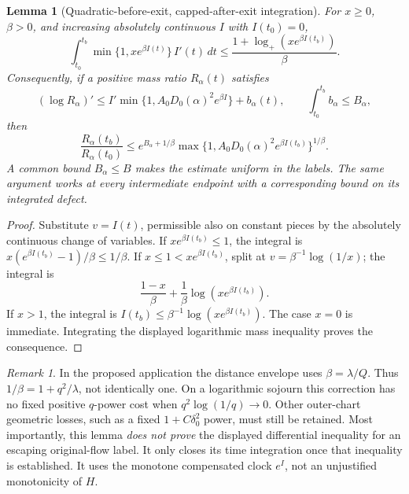 \documentclass[11pt]{article}
\newtheorem{lemma}[theorem]{Lemma}\newtheorem{proposition}[theorem]{Proposition}
\theoremstyle{remark}\newtheorem{remark}[theorem]{Remark}
\newcommand{\dd}{\,d}\newcommand{\E}{\mathbb E}
\begin{document}
\begin{lemma}[Quadratic-before-exit, capped-after-exit integration]
\label{inc:AN03:tailrepair:v1:gainintegration}
For $x\ge0$, $\beta>0$, and increasing absolutely continuous $I$ with $I(t_0)=0$,
\begin{equation}\label{inc:AN03:tailrepair:v1:minintegral}
 \int_{t_0}^{t_b}\min\{1,xe^{\beta I(t)}\}\,I'(t)\dd t
 \le\frac{1+\log_+(xe^{\beta I(t_b)})}{\beta}.
\end{equation}
Consequently, if a positive mass ratio $R_\alpha(t)$ satisfies
\[
 (\log R_\alpha)'\le I'\min\{1,A_0D_0(\alpha)^2e^{\beta I}\}+b_\alpha(t),
 \qquad \int_{t_0}^{t_b}b_\alpha\le B_\alpha,
\]
then
\begin{equation}\label{inc:AN03:tailrepair:v1:labelgain}
 \frac{R_\alpha(t_b)}{R_\alpha(t_0)}
 \le e^{B_\alpha+1/\beta}
 \max\{1,A_0D_0(\alpha)^2e^{\beta I(t_b)}\}^{1/\beta}.
\end{equation}
A common bound $B_\alpha\le B$ makes the estimate uniform in the labels. The same argument works at every intermediate endpoint with a corresponding bound on its integrated defect.
\end{lemma}
\begin{proof}
Substitute $v=I(t)$, permissible also on constant pieces by the absolutely continuous change of variables. If $xe^{\beta I(t_b)}\le1$, the integral is $x(e^{\beta I(t_b)}-1)/\beta\le1/\beta$. If $x\le1<xe^{\beta I(t_b)}$, split at $v=\beta^{-1}\log(1/x)$; the integral is
\[
 \frac{1-x}{\beta}+\frac{1}{\beta}\log(xe^{\beta I(t_b)}).
\]
If $x>1$, the integral is $I(t_b)\le\beta^{-1}\log(xe^{\beta I(t_b)})$. The case $x=0$ is immediate. Integrating the displayed logarithmic mass inequality proves the consequence.
\end{proof}
\begin{remark}
In the proposed application the distance envelope uses $\beta=\lambda/Q$. Thus $1/\beta=1+q^2/\lambda$, not identically one. On a logarithmic sojourn this correction has no fixed positive $q$-power cost when $q^2\log(1/q)\to0$. Other outer-chart geometric losses, such as a fixed $1+C\delta_0^2$ power, must still be retained. Most importantly, this lemma \emph{does not prove} the displayed differential inequality for an escaping original-flow label. It only closes its time integration once that inequality is established. It uses the monotone compensated clock $e^I$, not an unjustified monotonicity of $H$.
\end{remark}
\end{document}
